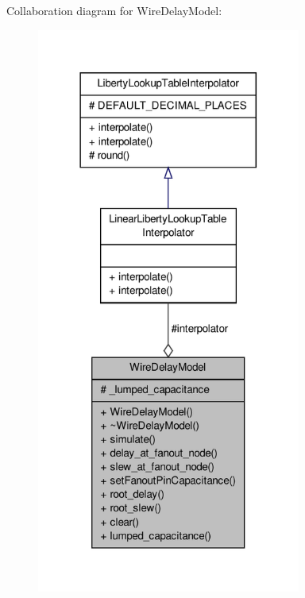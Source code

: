 Collaboration diagram for Wire\-Delay\-Model\-:\nopagebreak
\begin{figure}[H]
\begin{center}
\leavevmode
\includegraphics[width=246pt]{classWireDelayModel__coll__graph}
\end{center}
\end{figure}
